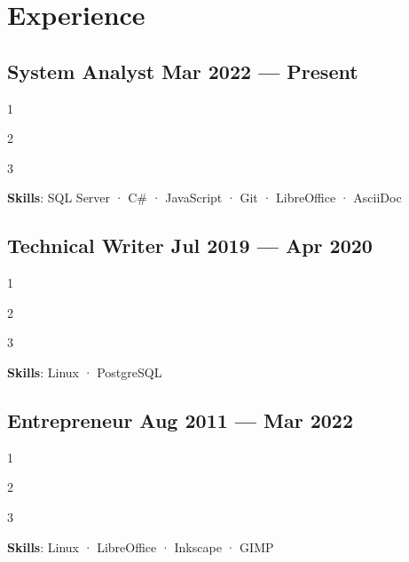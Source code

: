 \section{Experience}

\subsection{System Analyst \hfill Mar 2022 --- Present}

\begin{zitemize}
\item 1
\item 2
\item 3
\end{zitemize}

\textbf{Skills}: SQL Server · C\# · JavaScript · Git · LibreOffice · AsciiDoc

\vspace{1em}
\subsection{Technical Writer \hfill Jul 2019 --- Apr 2020}

\begin{zitemize}
\item 1
\item 2
\item 3
\end{zitemize}

\textbf{Skills}: Linux · PostgreSQL

\vspace{1em}
\subsection{Entrepreneur \hfill Aug 2011 --- Mar 2022}

\begin{zitemize}
\item 1
\item 2
\item 3
\end{zitemize}

\textbf{Skills}: Linux · LibreOffice · Inkscape · GIMP

\vspace{.5em}
